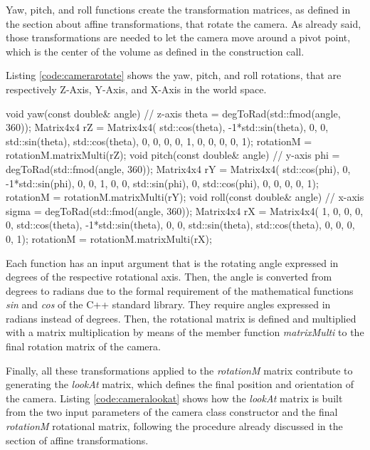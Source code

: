 \documentclass[12pt,a4paper]{extarticle}
\newcommand{\linespace}{\vspace{0pt}}
\begin{document}
Yaw, pitch, and roll functions create the transformation matrices, as defined in the section about affine transformations, that rotate the camera. As already said, those transformations are needed to let the camera move around a pivot point, which is the center of the volume as defined in the construction call.

Listing \ref{code:camerarotate} shows the yaw, pitch, and roll rotations, that are respectively Z-Axis, Y-Axis, and X-Axis in the world space.

\begin{cpp}[caption={},label=code:camerarotate]
void yaw(const double& angle) { // z-axis
	theta = degToRad(std::fmod(angle, 360));
	Matrix4x4 rZ = Matrix4x4(
		std::cos(theta), -1*std::sin(theta), 0, 0,
		std::sin(theta), std::cos(theta), 0, 0,
		0, 0, 1, 0,
		0, 0, 0, 1);
	rotationM = rotationM.matrixMulti(rZ);
}
void pitch(const double& angle) { // y-axis
	phi = degToRad(std::fmod(angle, 360));
	Matrix4x4 rY = Matrix4x4(
		std::cos(phi), 0, -1*std::sin(phi), 0,
		0, 1, 0, 0,
		std::sin(phi), 0, std::cos(phi), 0,
		0, 0, 0, 1);
	rotationM = rotationM.matrixMulti(rY);
}
void roll(const double& angle) { // x-axis
	sigma = degToRad(std::fmod(angle, 360));
	Matrix4x4 rX = Matrix4x4(
		1, 0, 0, 0,
		0, std::cos(theta), -1*std::sin(theta), 0,
		0, std::sin(theta), std::cos(theta), 0,
		0, 0, 0, 1);
	rotationM = rotationM.matrixMulti(rX);
}
\end{cpp}

Each function has an input argument that is the rotating angle expressed in degrees of the respective rotational axis. Then,  the angle is converted from degrees to radians due to the formal requirement of the mathematical functions \textit{sin} and \textit{cos} of the C++ standard library.  They require angles expressed in radians instead of degrees.
Then, the rotational matrix is defined and multiplied with a matrix multiplication by means of the member function \textit{matrixMulti} to the final rotation matrix of the camera.
\linespace

Finally, all these transformations applied to the \textit{rotationM} matrix contribute to generating the \textit{lookAt} matrix, which defines the final position and orientation of the camera. Listing \ref{code:cameralookat} shows how the \textit{lookAt} matrix is built from the two input parameters of the camera class constructor and the final \textit{rotationM} rotational matrix, following the procedure already discussed in the section of affine transformations.
\end{document}
